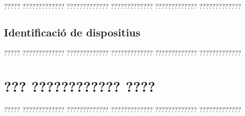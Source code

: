 \documentclass[11pt,catalan,listoffigures,listoftables]{tfgetsinf}
\begin{document}
????? ????????????? ????????????? ????????????? ????????????? ?????????????

\section{Identificació de dispositius}

????? ????????????? ????????????? ????????????? ????????????? ?????????????



\chapter{??? ???????????? ????}

????? ????????????? ????????????? ????????????? ????????????? ????????????? 



\end{document}
